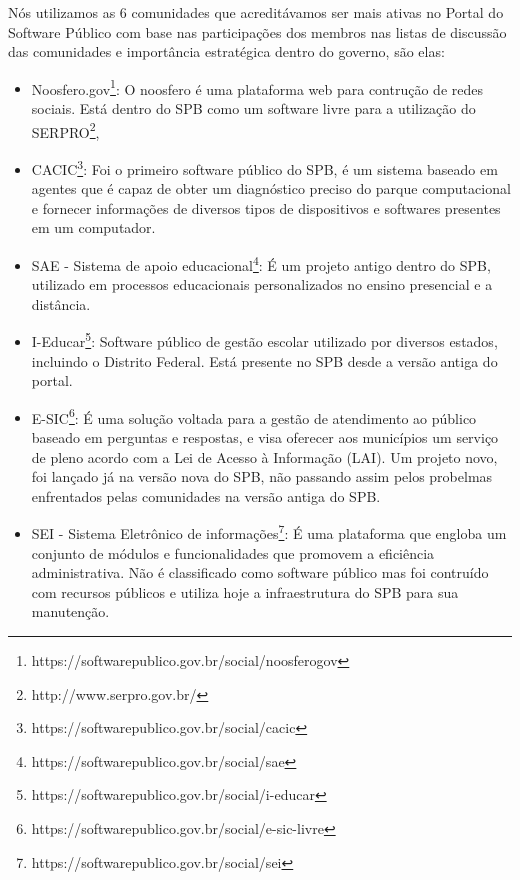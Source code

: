 Nós utilizamos as 6 comunidades que acreditávamos ser mais ativas
no Portal do Software Público com base nas participações dos membros nas listas de 
discussão das comunidades e importância estratégica dentro do governo, são elas:

\begin{itemize}

\item Noosfero.gov\footnote{https://softwarepublico.gov.br/social/noosferogov}: 
O noosfero é uma plataforma web para contrução de redes sociais. Está dentro do
SPB como um software livre para a utilização do SERPRO\footnote{http://www.serpro.gov.br/}, 

\item CACIC\footnote{https://softwarepublico.gov.br/social/cacic}: Foi o primeiro 
software público do SPB, é um sistema baseado em agentes que é capaz de obter um 
diagnóstico preciso do parque computacional e fornecer informações de diversos tipos 
de dispositivos e softwares presentes em um computador.

\item SAE - Sistema de apoio educacional\footnote{https://softwarepublico.gov.br/social/sae}:
É um projeto antigo dentro do SPB, utilizado em processos educacionais personalizados no 
ensino presencial e a distância.  

\item I-Educar\footnote{https://softwarepublico.gov.br/social/i-educar}: Software público de 
gestão escolar utilizado por diversos estados, incluindo o Distrito Federal. Está presente
no SPB desde a versão antiga do portal.

\item E-SIC\footnote{https://softwarepublico.gov.br/social/e-sic-livre}: É uma solução voltada 
para a gestão de atendimento ao público baseado em perguntas e respostas, e visa 
oferecer aos municípios um serviço de pleno acordo com a Lei de Acesso à Informação (LAI).
Um projeto novo, foi lançado já na versão nova do SPB, não passando assim pelos 
probelmas enfrentados pelas comunidades na versão antiga do SPB.

\item SEI - Sistema Eletrônico de informações\footnote{https://softwarepublico.gov.br/social/sei}:
É uma plataforma que engloba um conjunto de módulos e funcionalidades que promovem 
a eficiência administrativa. Não é classificado como software público mas foi contruído com
recursos públicos e utiliza hoje a infraestrutura do SPB para sua manutenção.

\end{itemize}


